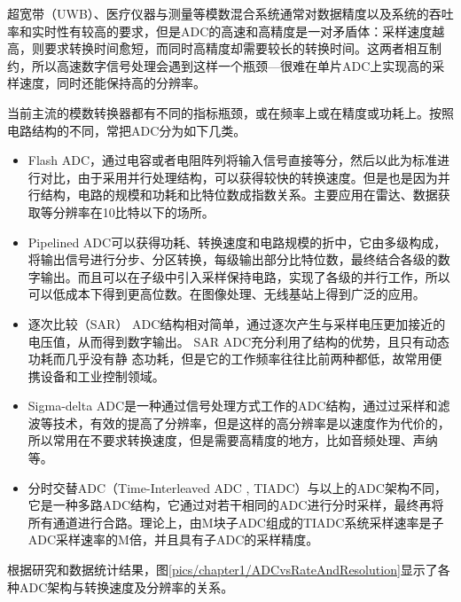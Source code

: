 	超宽带（UWB）、医疗仪器与测量等模数混合系统通常对数据精度以及系统的吞吐率和实时性有较高的要求，但是ADC的高速和高精度是一对矛盾体：采样速度越高，则要求转换时间愈短，而同时高精度却需要较长的转换时间。这两者相互制约，所以高速数字信号处理会遇到这样一个瓶颈---很难在单片ADC上实现高的采样速度，同时还能保持高的分辨率。\par
	当前主流的模数转换器都有不同的指标瓶颈，或在频率上或在精度或功耗上。按照电路结构的不同，常把ADC分为如下几类。
	\begin{itemize}
		\item    Flash ADC，通过电容或者电阻阵列将输入信号直接等分，然后以此为标准进行对比，由于采用并行处理结构，可以获得较快的转换速度。但是也是因为并行结构，电路的规模和功耗和比特位数成指数关系。主要应用在雷达、数据获取等分辨率在10比特以下的场所。
		\item
		Pipelined ADC可以获得功耗、转换速度和电路规模的折中，它由多级构成，将输出信号进行分步、分区转换，每级输出部分比特位数，最终结合各级的数字输出。而且可以在子级中引入采样保持电路，实现了各级的并行工作，所以可以低成本下得到更高位数。在图像处理、无线基站上得到广泛的应用。
		\item 
		逐次比较（SAR） ADC结构相对简单，通过逐次产生与采样电压更加接近的电压值，从而得到数字输出。
        SAR ADC充分利用了结构的优势，且只有动态功耗而几乎没有静 态功耗，但是它的工作频率往往比前两种都低，故常用便携设备和工业控制领域。
		\item Sigma-delta ADC是一种通过信号处理方式工作的ADC结构，通过过采样和滤波等技术，有效的提高了分辨率，但是这样的高分辨率是以速度作为代价的，所以常用在不要求转换速度，但是需要高精度的地方，比如音频处理、声纳等。
		\item  分时交替ADC（Time-Interleaved ADC , TIADC）与以上的ADC架构不同，它是一种多路ADC结构，它通过对若干相同的ADC进行分时采样，最终再将所有通道进行合路。理论上，由M块子ADC组成的TIADC系统采样速率是子ADC采样速率的M倍，并且具有子ADC的采样精度。
	\end{itemize}

	根据研究和数据统计结果，图\ref {pics/chapter1/ADCvsRateAndResolution}显示了各种ADC架构与转换速度及分辨率的关系。
	
